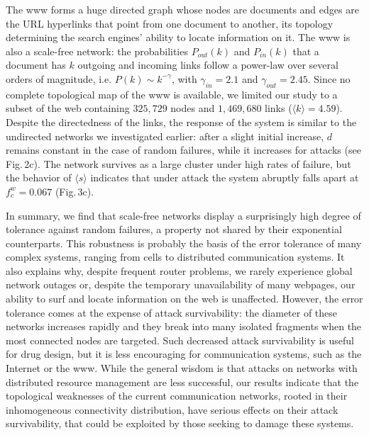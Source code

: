 The www forms a huge directed graph whose nodes are documents and edges are the URL hyperlinks that point from one document to another, its topology determining the search engines' ability to locate information on it. The www is also a scale-free network: the probabilities $P_{out}(k)$ and $P_{in}(k)$ that a document has $k$ outgoing and incoming links follow a power-law over several orders of magnitude, i.e. $P(k)\sim k^{-\gamma}$, with $\gamma_{in}=2.1$ and $\gamma_{out}=2.45$\cite{diam,ibm,small}. Since no complete topological map of the www is available, we limited our study to a subset of the web containing $325,729$ nodes and $1,469,680$ links ($\langle k\rangle=4.59$)\cite{diam}.
Despite the directedness of the links, the response of the system is similar to the undirected networks we investigated earlier: after a slight initial increase, $d$ remains constant in the case of random failures, while it increases for attacks (see Fig.$\,$2c). The network survives as a large cluster under high rates of failure, but the behavior of $\langle s\rangle$ indicates that under attack the system abruptly falls apart at $f_c^w=0.067$ (Fig.$\,$3c).

In summary, we find that scale-free networks display a surprisingly high degree of  tolerance against random failures, a property not shared by their exponential counterparts. This robustness is probably the basis of the error tolerance of many complex systems, ranging from cells\cite{jeong} to distributed communication systems. It also explains why, despite frequent router problems\cite{labovitz}, we rarely experience global network outages or, despite the temporary unavailability of many webpages, our ability to surf and locate information on the web is unaffected. However, the error tolerance comes at the expense of attack survivability: the diameter of these networks increases rapidly and they break into many isolated fragments when the most connected nodes are targeted. Such decreased attack survivability is useful for drug design\cite{jeong}, but it is less encouraging for communication systems, such as the Internet or the www. While the general wisdom is that attacks on networks with distributed resource management are less successful, our results indicate that the topological weaknesses of the current communication networks, rooted in their inhomogeneous connectivity distribution, have serious effects on their attack survivability, that could be exploited by those seeking to damage these systems.  
 
  

